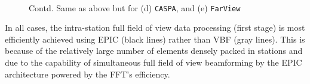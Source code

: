 \documentclass[
  journal=pasa,
  manuscript=article-type,
  year=2020,
  volume=37,
]{cup-journal}
\begin{document}
\begin{figure}\ContinuedFloat
{} \\
\caption{Contd. Same as above but for (d) \texttt{CASPA}, and (e) \texttt{FarView} \label{fig:1D-coherent-compcost}}
\end{figure}

In all cases, the intra-station full field of view data processing (first stage) is most efficiently achieved using EPIC (black lines) rather than VBF (gray lines). This is because of the relatively large number of elements densely packed in stations and due to the capability of simultaneous full field of view beamforming by the EPIC architecture powered by the FFT's efficiency. 
\end{document}
